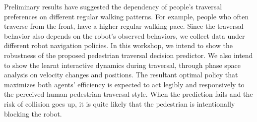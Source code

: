 \documentclass[conference]{IEEEtran}
\begin{document}
Preliminary results have suggested the dependency of people's traversal preferences 
on different regular walking patterns. For example, people who often traverse from 
the front, have a higher regular walking pace. Since the traversal 
behavior also depends on the robot's observed behaviors, we collect data under 
different robot navigation policies. In this workshop, we intend to show the 
robustness of the proposed pedestrian traversal decision predictor. We also 
intend to show the learnt interactive dynamics during traversal, through phase 
space analysis on velocity changes and positions. The resultant optimal 
policy that maximizes both agents' efficiency is expected to act legibly 
and responsively to the perceived human pedestrian traversal style. When the 
prediction fails and the risk of collision goes up, it is quite likely that 
the pedestrian is intentionally blocking the robot.

{\footnotesize


}
\end{document}
